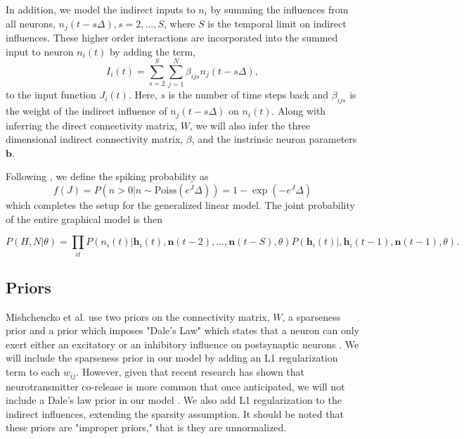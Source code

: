 \documentclass{article}
\begin{document}
In addition, we model the indirect inputs to $n_i$ by summing the
influences from all neurons, $n_j(t-s\Delta), s=2,...,S$, where $S$
is the temporal limit on indirect influences. These higher order
interactions are incorporated into the summed input to neuron
$n_i(t)$ by adding the term,
\begin{equation}
\label{new_term}
I_i(t)=\displaystyle\sum\limits_{s=2}^S\sum\limits_{j=1}^N \beta_{ijs}n_j(t-s\Delta),
\end{equation}
to the input function $J_i(t)$. Here, $s$ is the number of time
steps back and $\beta_{ijs}$ is the weight of the indirect influence
of $n_j(t-s\Delta)$ on $n_i(t)$. Along with inferring the direct connectivity matrix, $W$, we will
also infer the three dimensional indirect connectivity matrix, $\beta$, and the instrinsic neuron parameters $\mathbf{b}$.

Following \citep{mishchencko2011}, we define the spiking probability as 
\begin{equation} \label{f}
f(J) = P\left(n>0 | n \sim \text{Poiss}(e^J\Delta)\right) = 1 - \exp(-e^J\Delta)
\end{equation}
which completes the setup for the generalized linear model. The joint probability of the entire graphical model is then

\begin{equation} \label{f}
P(H,N|\theta) = \prod_{it}P(n_i(t)|\mathbf{h}_i(t),\mathbf{n}(t-2),...,\mathbf{n}(t-S),\theta)P(\mathbf{h}_i(t)|,\mathbf{h}_i(t-1),\mathbf{n}(t-1),\theta).
\end{equation}

\subsection{Priors}
Mishchencko et al. use two priors on the connectivity matrix, $W$,
a sparseness prior and a prior which imposes "Dale's Law" which
states that a neuron can only exert either an excitatory or an
inhibitory influence on postsynaptic neurons \citep{mishchencko2011}.
We will include the sparseness prior in our model by adding an L1
regularization term to each $w_{ij}$. However, given that recent
research has shown that neurotransmitter co-release is more common
that once anticipated, we will not include a Dale's law prior in
our model \citep{thomas2003}.  We also add L1 regularization to the
indirect influences, extending the sparsity assumption. It should
be noted that these priors are "improper priors," that is they are
unnormalized.
\end{document}
